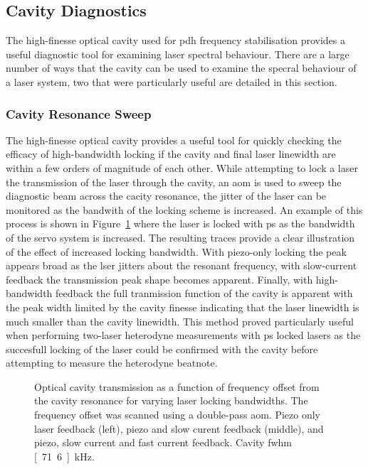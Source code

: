 \subsection{Cavity Diagnostics}

The high-finesse optical cavity used for \gls{pdh} frequency stabilisation provides a useful diagnostic tool for examining laser spectral behaviour.
There are a large number of ways that the cavity can be used to examine the specral behaviour of a laser system, two that were particularly useful are detailed in this section.

\subsubsection{Cavity Resonance Sweep}

The high-finesse optical cavity provides a useful tool for quickly checking the efficacy of high-bandwidth locking if the cavity and final laser linewidth are within a few orders of magnitude of each other.
While attempting to lock a laser the transmission of the laser through the cavity, an \gls{aom} is used to sweep the diagnostic beam across the cacity resonance, the jitter of the laser can be monitored as the bandwith of the locking scheme is increased.
An example of this process is shown in Figure~\ref{figure:cavity_scans} where the laser is locked with \gls{ps} as the bandwidth of the servo system is increased.
The resulting traces provide a clear illustration of the effect of increased locking bandwidth.
With piezo-only locking the peak appears broad as the lser jitters about the resonant frequency, with slow-current feedback the transmission peak shape becomes apparent.
Finally, with high-bandwidth feedback the full tranmission function of the cavity is apparent with the peak width limited by the cavity finesse indicating that the laser linewidth is much smaller than the cavity linewidth.
This method proved particularly useful when performing two-laser heterodyne measurements with \gls{ps} locked lasers as the succesfull locking of the laser could be confirmed with the cavity before attempting to measure the heterodyne beatnote.

\begin{figure}
\center

\caption{Optical cavity transmission as a function of frequency offset from the cavity resonance for varying laser locking bandwidths. The frequency offset was scanned using a double-pass \gls{aom}. Piezo only laser feedback (left), piezo and slow curent feedback (middle), and piezo, slow current and fast current feedback. Cavity \gls{fwhm} \unit[71.6]{kHz}.}
\label{figure:cavity_scans}
\end{figure}

